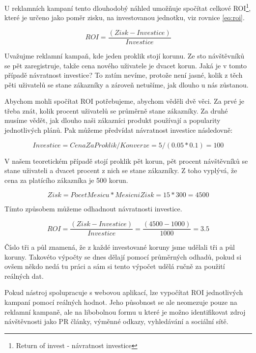 \documentclass[bc,male,java,dept456]{diploma}						%
\begin{document}
U reklamních kampaní tento dlouhodobý náhled umožňuje spočítat celkové ROI\footnote{Return of invest - návratnost investice}, které je určeno jako poměr zisku, na investovanou jednotku, viz rovnice \ref{eq:roi}.

\begin{equation}\label{eq:roi}
ROI = \frac{(Zisk - Investice)}{Investice}
\end{equation}

Uvažujme reklamní kampaň, kde jeden proklik stojí korunu. Ze sto návštěvníků se pět zaregistruje, takže cena nového uživatele je dvacet korun. Jaká je v tomto případě návratnost investice? To zatím nevíme, protože není jasné, kolik z těch pěti uživatelů se stane zákazníky a zároveň netušíme, jak dlouho u nás zůstanou.

Abychom mohli spočítat ROI potřebujeme, abychom věděli dvě věci. Za prvé je třeba znát, kolik procent uživatelů se průměrně stane zákazníky. Za druhé musíme vědět, jak dlouho naši zákazníci produkt používají a popularity jednotlivých plánů. Pak můžeme předvídat návratnost investice následovně:


\begin{equation}\label{eq:roi2}
Investice = CenaZaProklik / Konverze = 5 / (0.05 * 0.1) = 100
\end{equation}

V našem teoretickém případě stojí proklik pět korun, pět procent návštěvníků se stane uživateli a dvacet procent z nich se stane zákazníky. Z toho vyplývá, že cena za platícího zákazníka je 500 korun.


\begin{equation}\label{eq:roi3}
Zisk = PocetMesicu * MesicniZisk = 15 * 300 = 4500
\end{equation}

Tímto způsobem můžeme odhadnout návratnosti investice.

\begin{equation}\label{eq:roi4}
ROI = \frac{(Zisk - Investice)}{Investice} = \frac{(4500 - 1000)}{1000} = 3.5
\end{equation}

Číslo tři a půl znamená, že z každé investované koruny jsme udělali tři a půl koruny. Takovéto výpočty se dnes dělají pomocí průměrných odhadů, pokud si ovšem někdo nedá tu práci a sám si tento výpočet udělá ručně za použití reálných dat.

Pokud nástroj spolupracuje s webovou aplikací, lze vypočítat ROI jednotlivých kampaní pomocí reálných hodnot. Jeho působnost se ale neomezuje pouze na reklamní kampaně, ale na libobolnou formu u které je možno identifikovat zdroj návštěvnosti jako PR články, výměnné odkazy, vyhledávání a sociální sítě.
\end{document}
